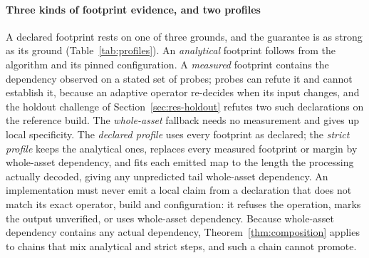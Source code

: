 \documentclass[preprint,3p,11pt,authoryear]{elsarticle}
\begin{document}
\paragraph{Three kinds of footprint evidence, and two profiles} A declared
footprint rests on one of three grounds, and the guarantee is as strong as its
ground (Table~\ref{tab:profiles}). An \emph{analytical} footprint follows from the
algorithm and its pinned configuration. A \emph{measured} footprint contains the
dependency observed on a stated set of probes; probes can refute it and cannot
establish it, because an adaptive operator re-decides when its input changes, and
the holdout challenge of Section~\ref{sec:res-holdout} refutes two such
declarations on the reference build. The \emph{whole-asset} fallback needs no
measurement and gives up local specificity. The \emph{declared profile} uses every
footprint as declared; the \emph{strict profile} keeps the analytical ones,
replaces every measured footprint or margin by whole-asset dependency, and fits
each emitted map to the length the processing actually decoded, giving any
unpredicted tail whole-asset dependency. An implementation must never emit a
local claim from a declaration that does not match its exact operator, build and
configuration: it refuses the operation, marks the output unverified, or uses
whole-asset dependency. Because whole-asset dependency contains any actual
dependency, Theorem~\ref{thm:composition} applies to chains that mix analytical
and strict steps, and such a chain cannot promote.

\begin{table}[t]
\centering
\caption{The v1 operator set. The analytical column is a support radius derived
from the pinned algorithm configuration; the margin covers implementation
behaviour that the analysis does not capture, such as frame-granular cut points
and a correlation search range; the declared footprint is their sum and is the
quantity Section~\ref{sec:res-containment} probes.
All values are in
source samples for the configurations used in the experiments, so
transcoding takes a row per codec and the eight operators occupy nine rows;
concatenation assembles the corpus clips rather than transforming them
(Section~\ref{sec:corpus}), leaving the eight transformations
Section~\ref{sec:results} counts and, among those, the \Kops{} single-source
configurations Section~\ref{sec:res-containment} probes. By
Proposition~\ref{prop:footprint} erring large only weakens the emitted claim;
erring small is a conformance failure. These
values hold for one FFmpeg build and are not portable. The MP3 and time-stretch
rows are measured, and the holdout of Section~\ref{sec:res-holdout} exceeds both
on the reference build; on the Linux build of Section~\ref{sec:res-independent} the
MP3 row is also under-declared at the probes of Section~\ref{sec:res-containment}. Section~\ref{sec:limits} states the normalisation row's
represented-content reading and its tested alternative.}
\label{tab:operators}
\small

\end{table}
\end{document}
